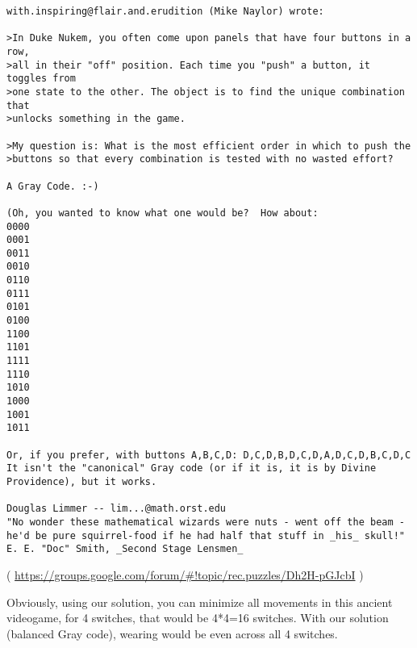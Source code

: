 \begin{lstlisting}
with.inspiring@flair.and.erudition (Mike Naylor) wrote:

>In Duke Nukem, you often come upon panels that have four buttons in a row,
>all in their "off" position. Each time you "push" a button, it toggles from
>one state to the other. The object is to find the unique combination that
>unlocks something in the game.

>My question is: What is the most efficient order in which to push the
>buttons so that every combination is tested with no wasted effort?

A Gray Code. :-)

(Oh, you wanted to know what one would be?  How about:
0000
0001
0011
0010
0110
0111
0101
0100
1100
1101
1111
1110
1010
1000
1001
1011

Or, if you prefer, with buttons A,B,C,D: D,C,D,B,D,C,D,A,D,C,D,B,C,D,C
It isn't the "canonical" Gray code (or if it is, it is by Divine
Providence), but it works.

Douglas Limmer -- lim...@math.orst.edu
"No wonder these mathematical wizards were nuts - went off the beam -
he'd be pure squirrel-food if he had half that stuff in _his_ skull!"
E. E. "Doc" Smith, _Second Stage Lensmen_
\end{lstlisting}

( \url{https://groups.google.com/forum/#!topic/rec.puzzles/Dh2H-pGJcbI} )

Obviously, using our solution, you can minimize all movements in this ancient videogame, for 4 switches, that would be 4*4=16 switches.
With our solution (balanced Gray code), wearing would be even across all 4 switches.

